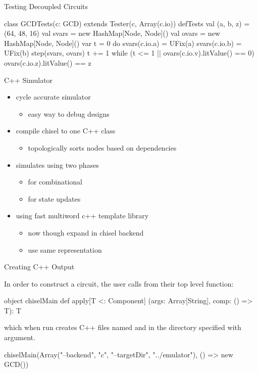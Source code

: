 \documentclass[xcolor=pdflatex,dvipsnames,table]{beamer}
\begin{document}
\begin{frame}[fragile]{Testing Decoupled Circuits}
\begin{scala}
class GCDTests(c: GCD) extends Tester(c, Array(c.io)) {
  defTests {
    val (a, b, z) = (64, 48, 16)
    val svars = new HashMap[Node, Node]()
    val ovars = new HashMap[Node, Node]()
    var t = 0
    do {
      svars(c.io.a) = UFix(a)
      svars(c.io.b) = UFix(b)
      step(svars, ovars)
      t += 1
    } while (t <= 1 || ovars(c.io.v).litValue() == 0)
    ovars(c.io.z).litValue() == z
  }
}
\end{scala}
\end{frame}

\begin{frame}[fragile]{C++ Simulator}
\begin{itemize}
\item cycle accurate simulator
\begin{itemize}
\item easy way to debug designs
\end{itemize}
\item compile chisel to one C++ class
\begin{itemize}
\item topologically sorts nodes based on dependencies
\end{itemize}
\item simulates using two phases
\begin{itemize}
\item {} for combinational
\item {} for state updates
\end{itemize}
\item using fast multiword c++ template library
\begin{itemize}
\item now though expand in chisel backend
\item use same representation 
\end{itemize}
\end{itemize}
\end{frame}

\begin{frame}[fragile]{Creating C++ Output}

In order to construct a circuit, 
the user calls  from their top level  function:

\begin{scala}
object chiselMain {
  def apply[T <: Component]
    (args: Array[String], comp: () => T): T
}
\end{scala}

\noindent
which when run creates C++ files named
 and  in
the directory specified with
 argument.

\begin{scala}
chiselMain(Array("--backend", "c", "--targetDir", "../emulator"), 
           () => new GCD())
\end{scala}

\end{frame}
\end{document}

